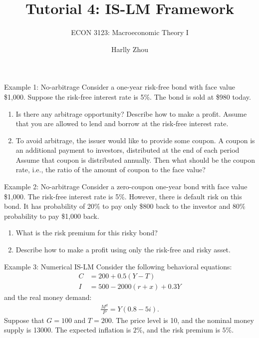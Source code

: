 \documentclass[xcolor=dvipsnames]{beamer}
\title[Measurment of Macroeconomy]{Tutorial 4: IS-LM Framework}
\subtitle{ECON 3123: Macroeconomic Theory I}
\author[Harlly Zhou]{Harlly Zhou}
\institute[HKUST]{Department of Economics\\
HKUST Business School}
\date{}
\begin{document}
\begin{frame}
\titlepage
\end{frame}

\begin{frame}{Example 1: No-arbitrage}
    Consider a one-year risk-free bond with face value \$1,000. Suppose the risk-free interest rate is 5\%. The bond is sold at \$980 today.
    \begin{enumerate}
        \item Is there any arbitrage opportunity? Describe how to make a profit. Assume that you are allowed to lend and borrow at the risk-free interest rate.
        \item To avoid arbitrage, the issuer would like to provide some coupon. A coupon is an additional payment to investors, distributed at the end of each period Assume that coupon is distributed annually. Then what should be the coupon rate, i.e., the ratio of the amount of coupon to the face value?
    \end{enumerate}
\end{frame}

\begin{frame}{Example 2: No-arbitrage}
    Consider a zero-coupon one-year bond with face value \$1,000. The risk-free interest rate is 5\%. However, there is default risk on this bond. It has probability of 20\% to pay only \$800 back to the investor and 80\% probability to pay \$1,000 back. 
    \begin{enumerate}
        \item What is the risk premium for this risky bond?
        \item Describe how to make a profit using only the risk-free and risky asset.
    \end{enumerate}
\end{frame}

\begin{frame}{Example 3: Numerical IS-LM}
    Consider the following behavioral equations:
    \begin{align*}
        C &= 200 + 0.5(Y-T)\\
        I &= 500 - 2000(r+x) + 0.3Y
    \end{align*}
    and the real money demand:
    \begin{align*}
        \frac{M^d}{P} = Y(0.8-5i).
    \end{align*}
    Suppose that $G = 100$ and $T = 200$. The price level is 10, and the nominal money supply is 13000. The expected inflation is $2\%$, and the risk premium is $5\%$.
\end{frame}
\end{document}
